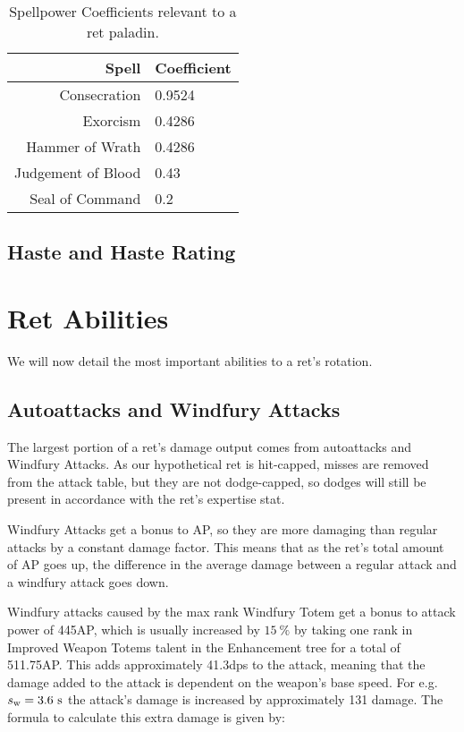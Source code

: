 \documentclass[letterpaper,11pt]{article}
\begin{document}
	\begin{table}[htb]
		\centering
		\begin{tabular}{r | l}
			Spell & Coefficient \\
			\hline \hline
			Consecration & 0.9524 \\
			Exorcism & 0.4286 \\
			Hammer of Wrath & 0.4286 \\
			Judgement of Blood & 0.43 \\
			Seal of Command & 0.2 \\
			\hline
		\end{tabular}
		\caption{Spellpower Coefficients relevant to a ret paladin.}		
		\label{tab:spellcoefficients}
	\end{table}

	\subsection{Haste and Haste Rating}
	
	
	\section{Ret Abilities}
	We will now detail the most important abilities to a ret's rotation.

	\subsection{Autoattacks and Windfury Attacks}
	The largest portion of a ret's damage output comes from autoattacks and Windfury Attacks.
	As our hypothetical ret is hit-capped, misses are removed from the attack table, but they are not dodge-capped, so dodges will still be present in accordance with the ret's expertise stat.
	
	Windfury Attacks get a bonus to AP, so they are more damaging than regular attacks by a constant damage factor.
	This means that as the ret's total amount of AP goes up, the difference in the average damage between a regular attack and a windfury attack goes down.
	
	Windfury attacks caused by the max rank Windfury Totem get a bonus to attack power of 445AP, which is usually increased by $15~\%$ by taking one rank in Improved Weapon Totems talent in the Enhancement tree for a total of 511.75AP.
	This adds approximately 41.3dps to the attack, meaning that the damage added to the attack is dependent on the weapon's base speed.
	For e.g. $s_\mathrm{w}  = 3.6~\mathrm{s}$ the attack's damage is increased by approximately 131 damage.
	The formula to calculate this extra damage is given by:
	
\end{document}
